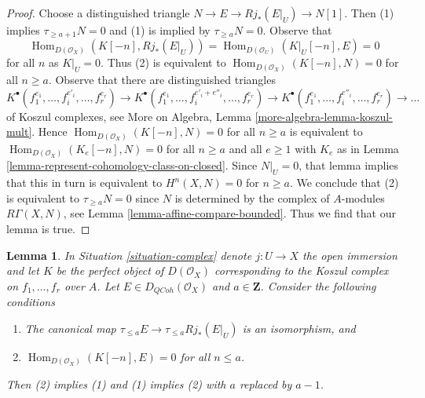 \documentclass{stacks-project}
\theoremstyle{plain}
\newtheorem{lemma}[subsection]{Lemma}
\theoremstyle{definition}
\theoremstyle{remark}
\numberwithin{equation}{subsection}
\def\Hom{\mathop{\mathrm{Hom}}\nolimits}
\def\QCoh{\mathit{QCoh}}
\begin{document}
\begin{proof}
Choose a distinguished triangle $N \to E \to Rj_*(E|_U) \to N[1]$.
Then (1) implies $\tau_{\geq a + 1} N = 0$ and (1) is implied by
$\tau_{\geq a}N = 0$. Observe that
$$
\Hom_{D(\mathcal{O}_X)}(K[-n], Rj_*(E|_U)) =
\Hom_{D(\mathcal{O}_U)}(K|_U[-n], E) = 0
$$
for all $n$ as $K|_U = 0$. Thus (2) is equivalent to
$\Hom_{D(\mathcal{O}_X)}(K[-n], N) = 0$ for all $n \geq a$. 
Observe that there are distinguished triangles
$$
K^\bullet(f_1^{e_1}, \ldots, f_i^{e'_i}, \ldots, f_r^{e_r}) \to
K^\bullet(f_1^{e_1}, \ldots, f_i^{e'_i + e''_i}, \ldots, f_r^{e_r}) \to
K^\bullet(f_1^{e_1}, \ldots, f_i^{e''_i}, \ldots, f_r^{e_r}) \to \ldots
$$
of Koszul complexes, see
More on Algebra, Lemma \ref{more-algebra-lemma-koszul-mult}. Hence
$\Hom_{D(\mathcal{O}_X)}(K[-n], N) = 0$ for all $n \geq a$
is equivalent to
$\Hom_{D(\mathcal{O}_X)}(K_e[-n], N) = 0$ for all $n \geq a$ and
all $e \geq 1$ with $K_e$ as in
Lemma \ref{lemma-represent-cohomology-class-on-closed}.
Since $N|_U = 0$, that lemma implies that this in turn is equivalent to
$H^n(X, N) = 0$ for $n \geq a$. We conclude that (2) is equivalent
to $\tau_{\geq a}N = 0$ since $N$ is determined by the complex of
$A$-modules $R\Gamma(X, N)$, see Lemma \ref{lemma-affine-compare-bounded}.
Thus we find that our lemma is true.
\end{proof}

\begin{lemma}
\label{lemma-orthogonal-koszul-second-variant}
In Situation \ref{situation-complex} denote $j : U \to X$ the open
immersion and let $K$ be the perfect object of $D(\mathcal{O}_X)$
corresponding to the Koszul complex on $f_1, \ldots, f_r$ over $A$.
Let $E \in D_\QCoh(\mathcal{O}_X)$ and $a \in \mathbf{Z}$. Consider
the following conditions
\begin{enumerate}
\item The canonical map $\tau_{\leq a}E \to \tau_{\leq a} Rj_*(E|_U)$
is an isomorphism, and
\item $\Hom_{D(\mathcal{O}_X)}(K[-n], E) = 0$ for all $n \leq a$.
\end{enumerate}
Then (2) implies (1) and (1) implies (2) with $a$ replaced by $a - 1$.
\end{lemma}
\end{document}
